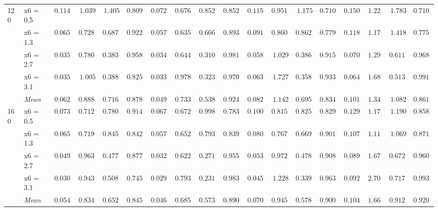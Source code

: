 \begin{table}[htbp]
\begin{tabular}{llrrrrrrrrrrrrrrrr}
\multirow{5}{*}{120} & x6 = 0.5 & $0.1149$ & $1.039$ & $1.405$ & $0.8096$ & {\boldmath$0.0723$} & {\boldmath$0.6761$} & {\boldmath$0.8521$} & {\boldmath$0.8525$} & $0.1157$ & $0.9518$ & $1.175$ & $0.7100$ & $0.1506$ & $1.229$ & $1.783$ & $0.7100$ \\
 & x6 = 1.3 & $0.0656$ & $0.7280$ & $0.6875$ & {\boldmath$0.9229$} & {\boldmath$0.0574$} & {\boldmath$0.6359$} & {\boldmath$0.6661$} & $0.8936$ & $0.0918$ & $0.8605$ & $0.8627$ & $0.7793$ & $0.1186$ & $1.175$ & $1.418$ & $0.7754$ \\
 & x6 = 2.7 & $0.0354$ & $0.7809$ & $0.3830$ & {\boldmath$0.9580$} & {\boldmath$0.0343$} & {\boldmath$0.6441$} & {\boldmath$0.3109$} & $0.9814$ & $0.0588$ & $1.029$ & $0.3864$ & $0.9150$ & $0.0709$ & $1.299$ & $0.6118$ & $0.9688$ \\
 & x6 = 3.1 & $0.0355$ & $1.005$ & $0.3884$ & $0.8252$ & {\boldmath$0.0336$} & {\boldmath$0.9784$} & {\boldmath$0.3238$} & $0.9707$ & $0.0636$ & $1.727$ & $0.3583$ & {\boldmath$0.9336$} & $0.0649$ & $1.686$ & $0.5136$ & $0.9912$ \\
 & \textit{Mean} & $0.0628$ & $0.8884$ & $0.7160$ & $0.8789$ & \colorbox{green!20}{\boldmath$0.0494$} & \colorbox{green!20}{\boldmath$0.7336$} & \colorbox{green!20}{\boldmath$0.5382$} & \colorbox{green!20}{\boldmath$0.9246$} & $0.0825$ & $1.142$ & $0.6957$ & $0.8345$ & $0.1012$ & $1.347$ & $1.082$ & $0.8613$ \\
\midrule
\multirow{5}{*}{160} & x6 = 0.5 & $0.0731$ & $0.7128$ & {\boldmath$0.7801$} & {\boldmath$0.9141$} & {\boldmath$0.0673$} & {\boldmath$0.6724$} & $0.9984$ & $0.7832$ & $0.1006$ & $0.8151$ & $0.8253$ & $0.8291$ & $0.1295$ & $1.170$ & $1.190$ & $0.8584$ \\
 & x6 = 1.3 & $0.0658$ & $0.7193$ & $0.8450$ & $0.8428$ & {\boldmath$0.0573$} & {\boldmath$0.6520$} & $0.7931$ & $0.8398$ & $0.0807$ & $0.7678$ & {\boldmath$0.6693$} & {\boldmath$0.9014$} & $0.1072$ & $1.113$ & $1.069$ & $0.8711$ \\
 & x6 = 2.7 & $0.0496$ & $0.9630$ & $0.4770$ & $0.8779$ & {\boldmath$0.0328$} & {\boldmath$0.6225$} & {\boldmath$0.2719$} & {\boldmath$0.9551$} & $0.0532$ & $0.9725$ & $0.4788$ & $0.9082$ & $0.0892$ & $1.670$ & $0.6728$ & $0.9600$ \\
 & x6 = 3.1 & $0.0303$ & $0.9437$ & $0.5085$ & $0.7451$ & {\boldmath$0.0291$} & {\boldmath$0.7932$} & {\boldmath$0.2310$} & $0.9834$ & $0.0457$ & $1.228$ & $0.3392$ & {\boldmath$0.9639$} & $0.0925$ & $2.702$ & $0.7174$ & $0.9932$ \\
 & \textit{Mean} & $0.0547$ & $0.8347$ & $0.6527$ & $0.8450$ & \colorbox{green!20}{\boldmath$0.0466$} & \colorbox{green!20}{\boldmath$0.6850$} & \colorbox{green!20}{\boldmath$0.5736$} & $0.8904$ & $0.0701$ & $0.9459$ & $0.5782$ & $0.9006$ & $0.1046$ & $1.664$ & $0.9121$ & \colorbox{green!20}{\boldmath$0.9207$} \\
\bottomrule
\end{tabular}
\end{table}

